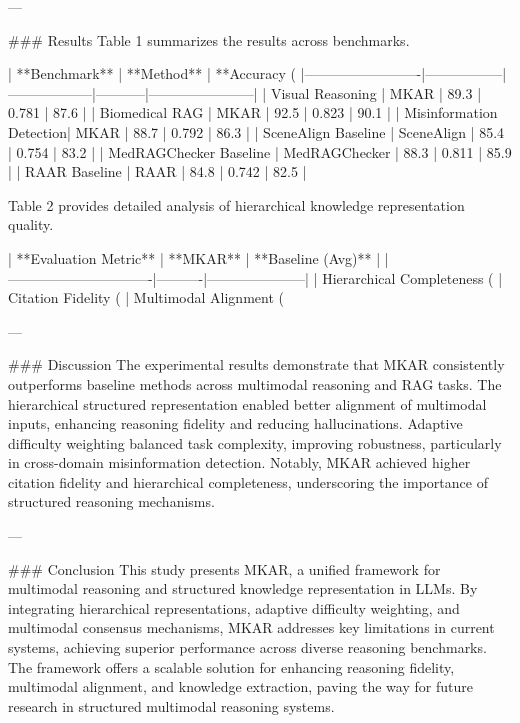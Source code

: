 ---

### Results
Table 1 summarizes the results across benchmarks.

| **Benchmark**          | **Method**      | **Accuracy (%
|-------------------------|-----------------|------------------|-----------|-----------------------|
| Visual Reasoning        | MKAR            | 89.3             | 0.781     | 87.6                 |
| Biomedical RAG          | MKAR            | 92.5             | 0.823     | 90.1                 |
| Misinformation Detection| MKAR            | 88.7             | 0.792     | 86.3                 |
| SceneAlign Baseline     | SceneAlign      | 85.4             | 0.754     | 83.2                 |
| MedRAGChecker Baseline  | MedRAGChecker   | 88.3             | 0.811     | 85.9                 |
| RAAR Baseline           | RAAR            | 84.8             | 0.742     | 82.5                 |

Table 2 provides detailed analysis of hierarchical knowledge representation quality.

| **Evaluation Metric**        | **MKAR** | **Baseline (Avg)** |
|-------------------------------|----------|---------------------|
| Hierarchical Completeness (%
| Citation Fidelity (%
| Multimodal Alignment (%

---

### Discussion
The experimental results demonstrate that MKAR consistently outperforms baseline methods across multimodal reasoning and RAG tasks. The hierarchical structured representation enabled better alignment of multimodal inputs, enhancing reasoning fidelity and reducing hallucinations. Adaptive difficulty weighting balanced task complexity, improving robustness, particularly in cross-domain misinformation detection. Notably, MKAR achieved higher citation fidelity and hierarchical completeness, underscoring the importance of structured reasoning mechanisms.

---

### Conclusion
This study presents MKAR, a unified framework for multimodal reasoning and structured knowledge representation in LLMs. By integrating hierarchical representations, adaptive difficulty weighting, and multimodal consensus mechanisms, MKAR addresses key limitations in current systems, achieving superior performance across diverse reasoning benchmarks. The framework offers a scalable solution for enhancing reasoning fidelity, multimodal alignment, and knowledge extraction, paving the way for future research in structured multimodal reasoning systems.

